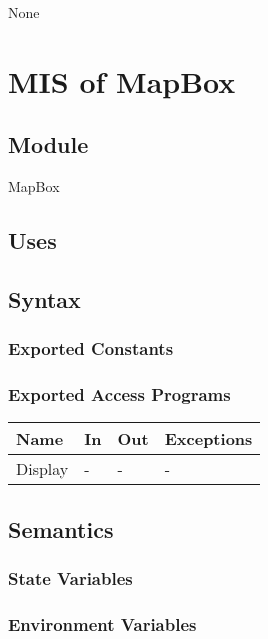 \documentclass[12pt, titlepage]{article}
\begin{document}
None

\newpage

\section{MIS of MapBox} \label{mMap}

\subsection{Module}

MapBox

\subsection{Uses}

\subsection{Syntax}

\subsubsection{Exported Constants}

\subsubsection{Exported Access Programs}

\begin{center}
\begin{tabular}{p{2cm} p{4cm} p{4cm} p{2cm}}
\hline
\textbf{Name} & \textbf{In} & \textbf{Out} & \textbf{Exceptions} \\
\hline
Display & - & - & - \\

\hline
\end{tabular}
\end{center}

\subsection{Semantics}

\subsubsection{State Variables}

\subsubsection{Environment Variables}
\end{document}
